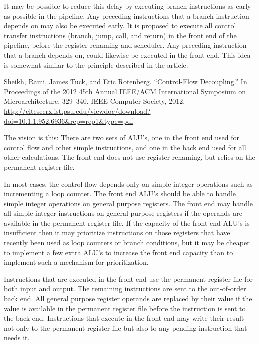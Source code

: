 \documentclass[forwardcom.tex]{subfiles}
\begin{document}
It may be possible to reduce this delay by executing branch instructions as early as possible in the pipeline. Any preceding instructions that a branch instruction depends on may also be executed early. It is proposed to execute all control transfer instructions (branch, jump, call, and return) in the front end of the pipeline, before the register renaming and scheduler. Any preceding instruction that a branch depends on, could likewise be executed in the front end. This idea is somewhat similar to the principle described in the article:

Sheikh, Rami, James Tuck, and Eric Rotenberg. “Control-Flow Decoupling.” In Proceedings of the 2012 45th Annual IEEE/ACM International Symposium on Microarchitecture, 329–340. IEEE Computer Society, 2012.
\url{http://citeseerx.ist.psu.edu/viewdoc/download?doi=10.1.1.952.6936&rep=rep1&type=pdf}
\vspace{2mm}

The vision is this: There are two sets of ALU's, one in the front end used for control flow and other simple instructions, and one in the back end used for all other calculations. The front end does not use register renaming, but relies on the permanent register file.
\vspace{2mm}

In most cases, the control flow depends only on simple integer operations such as incrementing a loop counter. The front end ALU's should be able to handle simple integer operations on general purpose registers. The front end may handle all simple integer instructions on general purpose registers if the operands are available in the permanent register file. If the capacity of the front end ALU's is insufficient then it may prioritize instructions on those registers that have recently been used as loop counters or branch conditions, but it may be cheaper to implement a few extra ALU's to increase the front end capacity than to implement such a mechanism for prioritization.
\vspace{2mm}

Instructions that are executed in the front end use the permanent register file for both input and output.  
The remaining instructions are sent to the out-of-order back end. 
All general purpose register operands are replaced by their value if the value is available in the permanent register file before the instruction is sent to the back end.
Instructions that execute in the front end may write their result not only to the permanent register file but also to any pending instruction that needs it.
\vspace{2mm}
\end{document}
